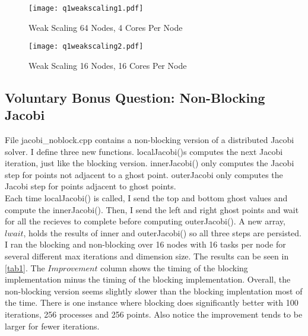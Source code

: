 \documentclass[10pt]{article}
\begin{document}
\lipsum

\begin{figure}[!h]
    \centering
    \begin{minipage}{0.45\textwidth}
        \centering
        \texttt{[image: q1weakscaling1.pdf]} %
        \caption{Weak Scaling 64 Nodes, 4 Cores Per Node}
        \label{fig1}
    \end{minipage}\hfill
         \begin{minipage}{0.45\textwidth}
        \centering
        \texttt{[image: q1weakscaling2.pdf]} %
        \caption{Weak Scaling 16 Nodes, 16 Cores Per Node}
        \label{fig2}
    \end{minipage}
\end{figure}

\lipsum

\subsection{Voluntary Bonus Question: Non-Blocking Jacobi}

File jacobi\_noblock.cpp contains a non-blocking version of a distributed Jacobi solver. I define three new functions. localJacobi()s computes the next Jacobi iteration, just like the blocking version. innerJacobi() only computes the Jacobi step for points not adjacent to a ghost point. outerJacobi only computes the Jacobi step for points adjacent to ghost points.\\

Each time localJacobi() is called, I send the top and bottom ghost values and compute the innerJacobi(). Then, I send the left and right ghost points and wait for all the recieves to complete before computing outerJacobi(). A new array, $lwait$, holds the results of inner and outerJacobi() so all three steps are persisted.\\

I ran the blocking and non-blocking over 16 nodes with 16 tasks per node for several different max iterations and dimension size. The results can be seen in \ref{tab1}. The $\textit{Improvement}$ column shows the timing of the blocking implementation minus the timing of the blocking implementation. Overall, the non-blocking version seems slightly slower than the blocking implentation most of the time. There is one instance where blocking does significantly better with 100 iterations, 256 processes and 256 points. Also notice the improvement tends to be larger for fewer iterations.
\end{document}
